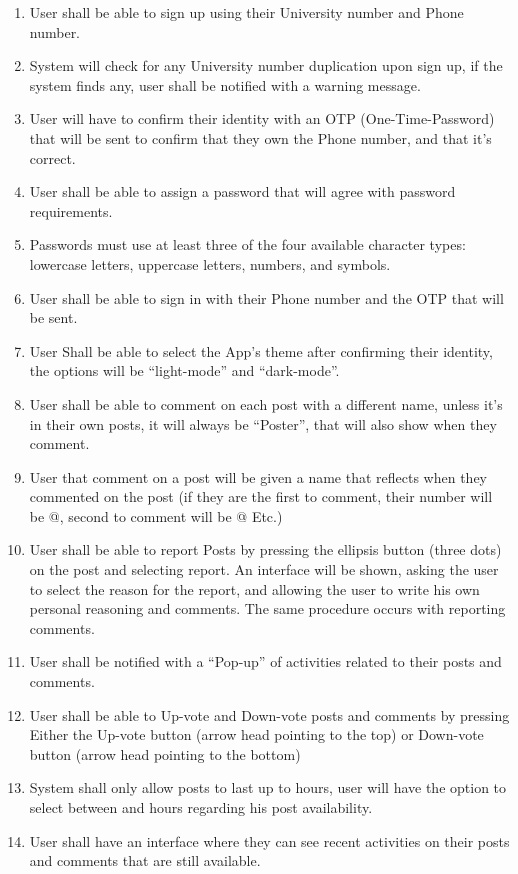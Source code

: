 \documentclass[12pt]{article}
\begin{document}
\begin{enumerate}
\item User shall be able to sign up using their University number and Phone number.
\item System will check for any University number duplication upon sign up, if the system finds any, user shall be notified with a warning message.
\item User will have to confirm their identity with an OTP (One-Time-Password) that will be sent to confirm that they own the Phone number, and that it's correct.
\item User shall be able to assign a password that will agree with password requirements.
\item Passwords must use at least three of the four available character types: lowercase letters, uppercase letters, numbers, and symbols.
\item User shall be able to sign in with their Phone number and the OTP that will be sent.
\item User Shall be able to select the App’s theme after confirming their identity, the options will be “light-mode” and “dark-mode”.
\item User shall be able to comment on each post with a different name, unless it’s in their own posts, it will always be “Poster”, that will also show when they comment.
\item User that comment on a post will be given a name that reflects when they commented on the post (if they are the first to comment, their number will be @, second to comment will be @ Etc.)
\item User shall be able to report Posts by pressing the ellipsis button (three dots) on the post and selecting report. An interface will be shown, asking the user to select the reason for the report, and allowing the user to write his own personal reasoning and comments. The same procedure occurs with reporting comments.
\item User shall be notified with a “Pop-up” of activities related to their posts and comments.
\item User shall be able to Up-vote and Down-vote posts and comments by pressing Either the Up-vote button (arrow head pointing to the top) or Down-vote button (arrow head pointing to the bottom)
\item System shall only allow posts to last up to hours, user will have the option to select between and hours regarding his post availability.
\item User shall have an interface where they can see recent activities on their posts and comments that are still available.

\end{enumerate}
\end{document}
